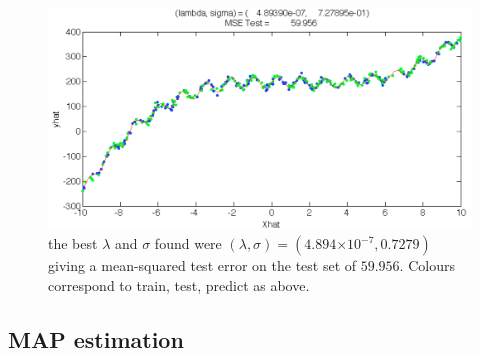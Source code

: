 \documentclass{article}
\begin{document}
\begin{enumerate}
  

  \begin{figure}[h]
    \centering
    \includegraphics[width=.65\textwidth]{./fig/nonlinearLS-123.png}
    \caption{the best $\lambda$ and $\sigma$ found were
      $(\lambda, \sigma) = (4.894\mathrm\times 10^{-7}, 0.7279)$ giving a mean-squared test
      error on the test set of $59.956$. Colours correspond to train, test,
      predict as above.}
    \label{fig:rbfnonlinearcv}
  \end{figure}
\end{enumerate}

\subsection{MAP estimation}
\label{sec:map-estimation}
\end{document}
